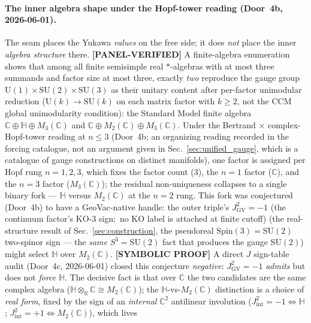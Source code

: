 \documentclass[11pt]{article}
\begin{document}
\paragraph{The inner algebra shape under the Hopf-tower reading (Door~4b,
  2026-06-01).} The seam places the Yukawa \emph{values} on the free
side; it does \emph{not} place the inner \emph{algebra structure}
there. \textbf{[PANEL-VERIFIED]} A finite-algebra enumeration shows that among all finite
semisimple real $*$-algebras with at most three summands and factor
size at most three, exactly \emph{two} reproduce the gauge group
$\mathrm{U}(1) \times \mathrm{SU}(2) \times \mathrm{SU}(3)$ as their
unitary content after per-factor unimodular reduction
($\mathrm{U}(k) \to \mathrm{SU}(k)$ on each matrix factor with $k \ge 2$, not the CCM global
unimodularity condition): the Standard Model finite algebra
$\mathbb{C} \oplus \mathbb{H} \oplus M_3(\mathbb{C})$ and
$\mathbb{C} \oplus M_2(\mathbb{C}) \oplus M_3(\mathbb{C})$. Under the
Bertrand $\times$ complex-Hopf-tower reading at $n \le 3$ (Door~4b;
an organizing reading recorded in the forcing catalogue, not an
argument given in Sec.~\ref{sec:unified_gauge}, which is a catalogue
of gauge constructions on distinct manifolds), one factor is assigned
per Hopf rung $n = 1, 2, 3$, which fixes the factor count ($3$), the
$n = 1$ factor ($\mathbb{C}$), and the $n = 3$ factor
($M_3(\mathbb{C})$); the residual non-uniqueness collapses to a single
binary fork --- $\mathbb{H}$ versus $M_2(\mathbb{C})$ at the $n = 2$
rung. This fork was conjectured (Door~4b) to have a GeoVac-native handle:
the outer triple's $J_{\mathrm{GV}}^2 = -1$ (the continuum factor's KO-3 sign;\ no KO label is attached at finite cutoff) (the
real-structure result of Sec.~\ref{sec:construction}, the pseudoreal
$\mathrm{Spin}(3) = \mathrm{SU}(2)$ two-spinor sign --- the
\emph{same} $S^3 = \mathrm{SU}(2)$ fact that produces the gauge
$\mathrm{SU}(2)$) might select $\mathbb{H}$ over $M_2(\mathbb{C})$. \textbf{[SYMBOLIC PROOF]} A
direct $J$ sign-table audit (Door~4c, 2026-06-01) closed this
conjecture \emph{negative}: $J_{\mathrm{GV}}^2 = -1$ \emph{admits} but
does not \emph{force} $\mathbb{H}$. The decisive fact is that over
$\mathbb{C}$ the two candidates are the same complex algebra
($\mathbb{H} \otimes_{\mathbb{R}} \mathbb{C} \cong M_2(\mathbb{C})$);
the $\mathbb{H}$-vs-$M_2(\mathbb{C})$ distinction is a choice of
\emph{real form}, fixed by the sign of an \emph{internal}
$\mathbb{C}^2$ antilinear involution
($J_{\mathrm{int}}^2 = -1 \Leftrightarrow \mathbb{H}$;
$J_{\mathrm{int}}^2 = +1 \Leftrightarrow M_2(\mathbb{C})$), which lives
\end{document}
